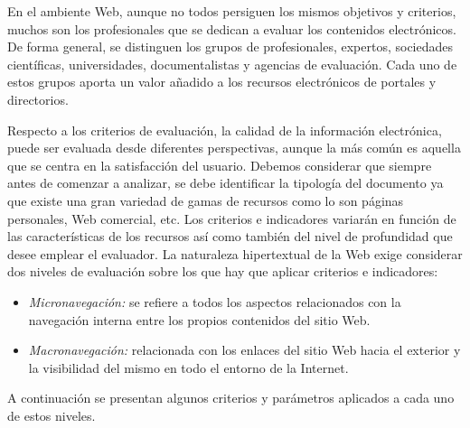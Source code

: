 En el ambiente Web, aunque no todos persiguen los mismos objetivos y criterios, muchos son los profesionales que se dedican a evaluar los contenidos electr\'onicos. De forma general, se distinguen los grupos de profesionales, expertos, sociedades cient\'ificas, universidades, documentalistas y agencias de evaluaci\'on. Cada uno de estos grupos aporta un valor a\~nadido a los recursos electr\'onicos de portales y directorios.

Respecto a los criterios de evaluaci\'on, la calidad de la informaci\'on electr\'onica, puede ser evaluada desde diferentes perspectivas, aunque la m\'as com\'un es aquella que se centra en la satisfacci\'on del usuario. Debemos considerar que siempre antes de comenzar a analizar, se debe identificar la tipolog\'ia del documento ya que existe una gran variedad de gamas de recursos como lo son p\'aginas personales, Web comercial, etc. Los criterios e indicadores variar\'an en funci\'on de las caracter\'isticas de los recursos as\'i como tambi\'en del nivel de profundidad que desee emplear el evaluador.
La naturaleza hipertextual de la Web exige considerar dos niveles de evaluaci\'on sobre los que hay que aplicar criterios e indicadores:

\begin{itemize}
\item \emph{Micronavegaci\'on:} se refiere a todos los aspectos relacionados con la navegaci\'on interna entre los propios contenidos del sitio Web.

\item \emph{Macronavegaci\'on:} relacionada con los enlaces del sitio Web hacia el exterior y la visibilidad del mismo en todo el entorno de la Internet.
\end{itemize}

A continuaci\'on se presentan algunos criterios y par\'ametros aplicados a cada uno de estos niveles.

